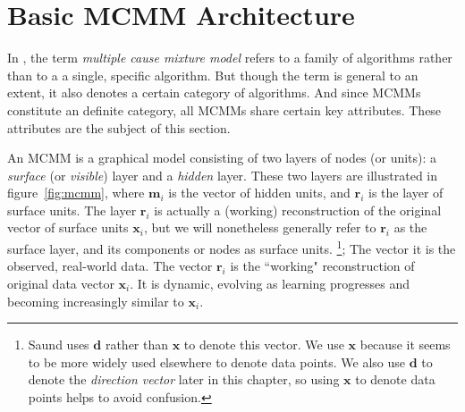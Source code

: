 
\section{Basic MCMM Architecture}
\label{sec:architecture}

In \citet{saund:94}, the term \emph{multiple cause mixture model} refers to a family of algorithms rather than to a  a single, 
specific algorithm. But though the term is general to an extent, it also denotes a certain category of algorithms.
And since MCMMs constitute an definite category, 
all MCMMs share certain key attributes.
These attributes are 
the subject of this section. 

An MCMM is a graphical model consisting of two layers of nodes (or units): a \emph{surface} (or \emph{visible}) 
layer and a \emph{hidden} layer.
These two layers are illustrated in figure~\ref{fig:mcmm}, where $\mathbf{m}_i$ 
is the vector of hidden units, and $\mathbf{r}_i$ is the layer of surface units. The layer $\mathbf{r}_i$ is actually a (working) reconstruction of the original vector of surface units $\mathbf{x}_i$, but we will nonetheless generally refer to $\mathbf{r}_i$ as the surface layer, and its components or nodes as surface units. 
\footnote{Saund uses $\mathbf{d}$ 
rather than $\mathbf{x}$ to denote this vector. We use $\mathbf{x}$ because it seems to be more widely
used elsewhere to denote data points. We also use $\mathbf{d}$ to denote the \emph{direction vector} later in this chapter, so using $\mathbf{x}$ to denote data points helps to avoid confusion.}; 
The vector it is the observed, 
real-world data. The vector $\mathbf{r}_i$ is the ``working" 
reconstruction of original data vector $\textbf{x}_i$. It is dynamic, evolving as learning progresses and  
becoming increasingly similar to $\mathbf{x}_i$. 

